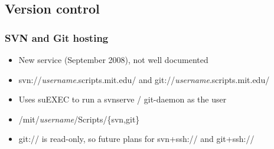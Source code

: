 \subsection{Version control}

\begin{frame}
  \frametitle{SVN and Git hosting}
  \begin{itemize}
    \item New service (September 2008), not well documented
    \item svn://\textit{username}.scripts.mit.edu/ and git://\textit{username}.scripts.mit.edu/
    \item Uses suEXEC to run a svnserve / git-daemon as the user
    \item /mit/\textit{username}/Scripts/\{svn,git\}
    \item git:// is read-only, so future plans for svn+ssh:// and git+ssh://
  \end{itemize}
\end{frame}
